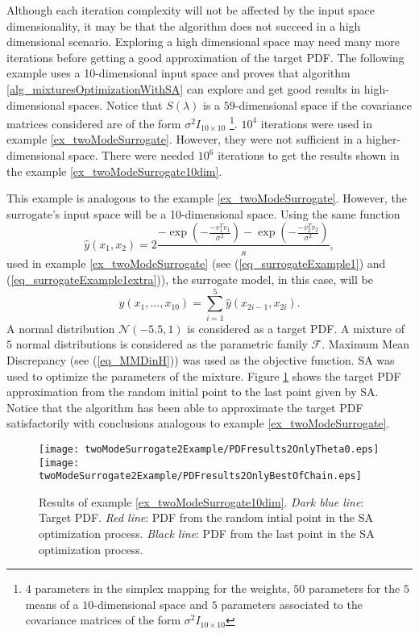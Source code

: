 Although each iteration complexity will not be affected by the input space dimensionality, it may be that the algorithm does not succeed in a high dimensional scenario. Exploring a high dimensional space may need many more iterations before getting a good approximation of the target PDF. The following example uses a 10-dimensional input space and proves that algorithm \ref{alg_mixturesOptimizationWithSA} can explore and get good results in high-dimensional spaces. Notice that $S(\lambda)$ is a $59$-dimensional space if the covariance matrices considered are of the form $\sigma^2 I_{10 \times 10}$ \footnote{$4$ parameters in the simplex mapping for the weights, $50$ parameters for the $5$ means of a $10$-dimensional space and $5$ parameters associated to the covariance matrices of the form $\sigma^2 I_{10 \times 10}$  }. $10^4$ iterations were used in example \ref{ex_twoModeSurrogate}. However, they were not sufficient in a higher-dimensional space. There were needed $10^6$ iterations to get the results shown in the example \ref{ex_twoModeSurrogate10dim}.

\begin{example} \label{ex_twoModeSurrogate10dim}
This example is analogous to the example \ref{ex_twoModeSurrogate}. However, the surrogate's input space will be a 10-dimensional space. Using the same function
$$ 
  \hat{y}(x_1,x_2) = 
       2\frac{-\exp(-\frac{-v_1^Tv_1}{\sigma^2})-\exp(-\frac{-v_2^Tv_2}{\sigma^2})}{s}, $$
used in example \ref{ex_twoModeSurrogate} (see (\ref{eq_surrogateExample1}) and (\ref{eq_surrogateExample1extra})), the surrogate model, in this case, will be 
$$
	y(x_1,...,x_{10}) = \sum_{i=1}^{5} \hat{y}(x_{2i-1},x_{2i}).
$$
A normal distribution $\mathcal{N}(-5.5,1)$ is considered as a target PDF.
A mixture of $5$ normal distributions is considered as the parametric family $\mathcal{F}$.
Maximum Mean Discrepancy (see (\ref{eq_MMDinH})) was used as the objective function.
SA was used to optimize the parameters of the mixture.
Figure \ref{fig_results2} shows the target PDF approximation from the random initial point to the last point given by SA.
Notice that the algorithm has been able to approximate the target PDF satisfactorily with conclusions analogous to example \ref{ex_twoModeSurrogate}.
\end{example}

\begin{figure}[!htbp]
  \centering
    \texttt{[image: twoModeSurrogate2Example/PDFresults2OnlyTheta0.eps]} 
    \texttt{[image: twoModeSurrogate2Example/PDFresults2OnlyBestOfChain.eps]} 
  \caption[Example \ref{ex_twoModeSurrogate10dim} - results]
{
  Results of example \ref{ex_twoModeSurrogate10dim}.
  \emph{Dark blue line}: Target PDF.
  \emph{Red line}: PDF from the random intial point in the SA optimization process. 
  \emph{Black line}: PDF from the last point in the SA optimization process. 
}
\label{fig_results2}
\end{figure}

